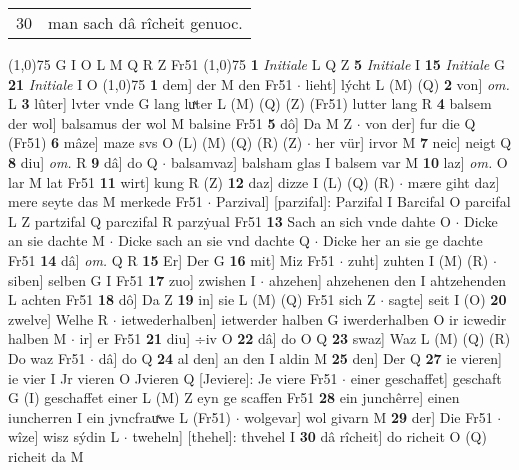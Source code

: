 \documentclass[8pt,a4paper,notitlepage]{article}
\begin{document}
\begin{table}[ht]
\begin{minipage}[t]{0.5\linewidth}
\begin{tabular}{rl}
30 & man sach dâ rîcheit genuoc.\\ 
\end{tabular}
\scriptsize
\line(1,0){75} \newline
G I O L M Q R Z Fr51 \newline
\line(1,0){75} \newline
\textbf{1} \textit{Initiale} L Q Z  \textbf{5} \textit{Initiale} I  \textbf{15} \textit{Initiale} G  \textbf{21} \textit{Initiale} I O  \newline
\line(1,0){75} \newline
\textbf{1} dem] der M den Fr51  $\cdot$ lieht] lýcht L (M) (Q) \textbf{2} von] \textit{om.} L \textbf{3} lûter] lvter vnde G lang luͯter L (M) (Q) (Z) (Fr51) lutter lang R \textbf{4} balsem der wol] balsamus der wol M balsine Fr51 \textbf{5} dô] Da M Z  $\cdot$ von der] fur die Q (Fr51) \textbf{6} mâze] maze svs O (L) (M) (Q) (R) (Z)  $\cdot$ her vür] irvor M \textbf{7} neic] neigt Q \textbf{8} diu] \textit{om.} R \textbf{9} dâ] do Q  $\cdot$ balsamvaz] balsham glas I balsem var M \textbf{10} laz] \textit{om.} O lar M lat Fr51 \textbf{11} wirt] kung R (Z) \textbf{12} daz] dizze I (L) (Q) (R)  $\cdot$ mære giht daz] mere seyte das M merkede Fr51  $\cdot$ Parzival] [parzifal]: Parzifal I Barcifal O parcifal L Z partzifal Q parczifal R parzẏual Fr51 \textbf{13} Sach an sich vnde dahte O  $\cdot$ Dicke an sie dachte M  $\cdot$ Dicke sach an sie vnd dachte Q  $\cdot$ Dicke her an sie ge dachte Fr51 \textbf{14} dâ] \textit{om.} Q R \textbf{15} Er] Der G \textbf{16} mit] Miz Fr51  $\cdot$ zuht] zuhten I (M) (R)  $\cdot$ siben] selben G I Fr51 \textbf{17} zuo] zwishen I  $\cdot$ ahzehen] ahzehenen den I ahtzehenden L achten Fr51 \textbf{18} dô] Da Z \textbf{19} in] sie L (M) (Q) Fr51 sich Z  $\cdot$ sagte] seit I (O) \textbf{20} zwelve] Welhe R  $\cdot$ ietwederhalben] ietwerder halben G iwerderhalben O ir icwedir halben M  $\cdot$ ir] er Fr51 \textbf{21} diu] ÷iv O \textbf{22} dâ] do O Q \textbf{23} swaz] Waz L (M) (Q) (R) Do waz Fr51  $\cdot$ dâ] do Q \textbf{24} al den] an den I aldin M \textbf{25} den] Der Q \textbf{27} ie vieren] ie vier I Jr vieren O Jvieren Q [Jeviere]: Je viere Fr51  $\cdot$ einer geschaffet] geschaft G (I) geschaffet einer L (M) Z eyn ge scaffen Fr51 \textbf{28} ein junchêrre] einen iuncherren I ein jvncfrauͯwe L (Fr51)  $\cdot$ wolgevar] wol givarn M \textbf{29} der] Die Fr51  $\cdot$ wîze] wisz sýdin L  $\cdot$ tweheln] [thehel]: thvehel I \textbf{30} dâ rîcheit] do richeit O (Q) richeit da M \newline
\end{minipage}

\end{table}
\end{document}
